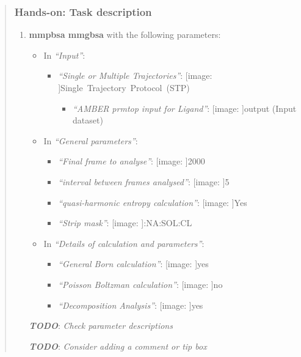 \documentclass[twocolumn]{bmcart}%
\def\texttt{[image: ]}
\providecommand{\tightlist}{%
  \setlength{\itemsep}{0pt}\setlength{\parskip}{0pt}}
\begin{document}
\begin{quote}
\hypertarget{hands-on-task-description-18}{%
\subsubsection{Hands-on: Task
description}\label{hands-on-task-description-18}}

\begin{enumerate}
\def\labelenumi{\arabic{enumi}.}
\tightlist
\item
  \textbf{mmpbsa mmgbsa} with the following parameters:

  \begin{itemize}
  \tightlist
  \item
    In \emph{``Input''}:

    \begin{itemize}
    \tightlist
    \item
      \emph{``Single or Multiple Trajectories''}:
      \texttt{Single\ Trajectory\ Protocol\ (STP)}

      \begin{itemize}
      \tightlist
      \item
        \emph{``AMBER prmtop input for Ligand''}: \texttt{output} (Input
        dataset)
      \end{itemize}
    \end{itemize}
  \item
    In \emph{``General parameters''}:

    \begin{itemize}
    \tightlist
    \item
      \emph{``Final frame to analyse''}: \texttt{2000}
    \item
      \emph{``interval between frames analysed''}: \texttt{5}
    \item
      \emph{``quasi-harmonic entropy calculation''}: \texttt{Yes}
    \item
      \emph{``Strip mask''}: \texttt{:NA:SOL:CL}
    \end{itemize}
  \item
    In \emph{``Details of calculation and parameters''}:

    \begin{itemize}
    \tightlist
    \item
      \emph{``General Born calculation''}: \texttt{yes}
    \item
      \emph{``Poisson Boltzman calculation''}: \texttt{no}
    \item
      \emph{``Decomposition Analysis''}: \texttt{yes}
    \end{itemize}
  \end{itemize}

  \textbf{\emph{TODO}}: \emph{Check parameter descriptions}

  \textbf{\emph{TODO}}: \emph{Consider adding a comment or tip box}
\end{enumerate}


\end{quote}
\end{document}
